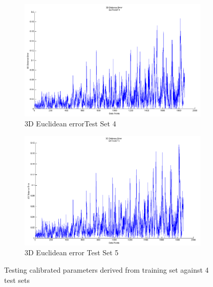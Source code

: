 \documentclass[15pt]{article}
\begin{document}
\begin{figure}%
\centering
\begin{subfigure}{\columnwidth}
\includegraphics[width=\columnwidth]{T4}%
\caption{3D Euclidean errorTest Set 4}%
\label{subfiga}%
\end{subfigure}\hfill%
\begin{subfigure}{\columnwidth}
\includegraphics[width=\columnwidth]{T5}%
\caption{3D Euclidean error Test Set 5}%
\label{subfiga}%
\end{subfigure}\hfill%
\caption{Testing calibrated parameters derived from training set against 4 test sets}
\label{figabc}
\end{figure}
\end{document}
